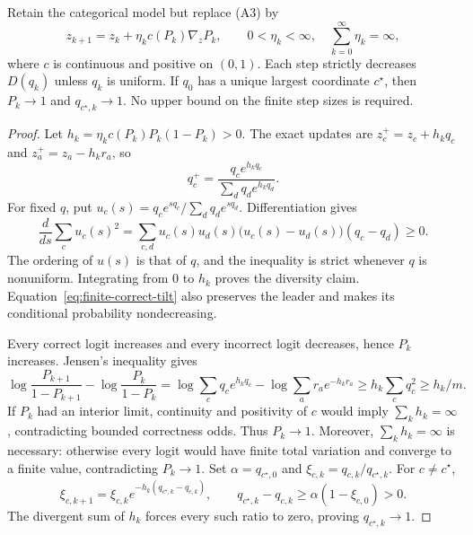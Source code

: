 \begin{theorem}
\enforcehalffinalproseline
\label{thm:finite-expected-steps}
Retain the categorical model but replace (A3) by
\begin{equation}
 z_{k+1}=z_k+\eta_k c(P_k)\nabla_zP_k,
 \qquad 0<\eta_k<\infty,\quad \sum_{k=0}^\infty\eta_k=\infty,
 \label{eq:finite-expected-update}
\end{equation}
where $c$ is continuous and positive on $(0,1)$. Each step strictly decreases
$D(q_k)$ unless $q_k$ is uniform. If $q_0$ has a unique largest coordinate
$c^\star$, then $P_k\to1$ and $q_{c^\star,k}\to1$.
No upper bound on the finite step sizes is required.
\end{theorem}

\begin{proof}
\enforcehalffinalproseline
Let $h_k=\eta_kc(P_k)P_k(1-P_k)>0$. The exact updates are
$z_c^+=z_c+h_kq_c$ and $z_a^+=z_a-h_kr_a$, so
\begin{equation}
 q_c^+=\frac{q_c e^{h_kq_c}}{\sum_dq_d e^{h_kq_d}}.
 \label{eq:finite-correct-tilt}
\end{equation}
For fixed $q$, put $u_c(s)=q_ce^{sq_c}/\sum_dq_de^{sq_d}$.
Differentiation gives
\[
 \frac{d}{ds}\sum_cu_c(s)^2
 =\sum_{c,d}u_c(s)u_d(s)
       \big(u_c(s)-u_d(s)\big)(q_c-q_d)\ge0.
\]
The ordering of $u(s)$ is that of $q$, and the inequality is strict whenever
$q$ is nonuniform. Integrating from $0$ to $h_k$ proves the diversity claim.
Equation~\eqref{eq:finite-correct-tilt} also preserves the leader and makes
its conditional probability nondecreasing.

Every correct logit increases and every incorrect logit decreases, hence
$P_k$ increases. Jensen's inequality gives
\[
 \log\frac{P_{k+1}}{1-P_{k+1}}-\log\frac{P_k}{1-P_k}
 =\log\sum_cq_c e^{h_kq_c}-\log\sum_ar_a e^{-h_kr_a}
 \ge h_k\sum_cq_c^2\ge h_k/m.
\]
If $P_k$ had an interior limit, continuity and positivity of $c$ would imply
$\sum_kh_k=\infty$, contradicting bounded correctness odds. Thus $P_k\to1$.
Moreover, $\sum_kh_k=\infty$ is necessary: otherwise every logit would have
finite total variation and converge to a finite value, contradicting
$P_k\to1$.
Set $\alpha=q_{c^\star,0}$ and
$\xi_{c,k}=q_{c,k}/q_{c^\star,k}$. For $c\ne c^\star$,
\[
 \xi_{c,k+1}=\xi_{c,k}
  e^{-h_k(q_{c^\star,k}-q_{c,k})},
 \qquad
 q_{c^\star,k}-q_{c,k}
 \ge\alpha(1-\xi_{c,0})>0.
\]
The divergent sum of $h_k$ forces every such ratio to zero, proving
$q_{c^\star,k}\to1$.
\end{proof}

